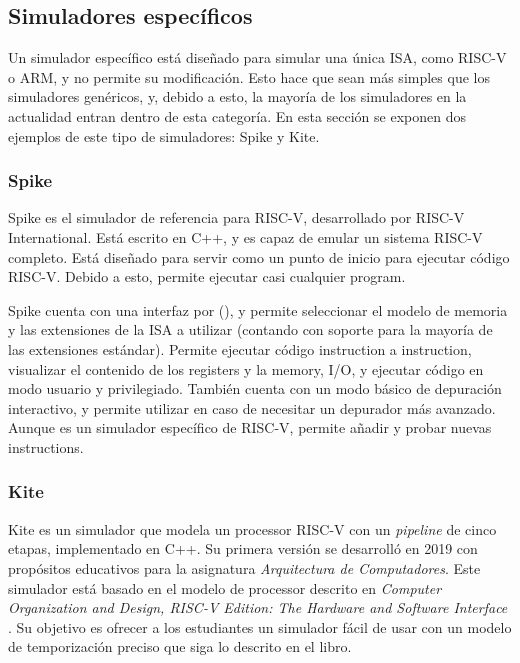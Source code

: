 \subsection{Simuladores específicos}

Un simulador específico está diseñado para simular una única \gls{ISA}, como
RISC-V o ARM, y no permite su modificación. Esto hace que sean más simples que
los simuladores genéricos, y, debido a esto, la mayoría de los simuladores en la
actualidad entran dentro de esta categoría. En esta sección se exponen dos
ejemplos de este tipo de simuladores: Spike y Kite.

\subsubsection{Spike}

Spike \parencite{spike} es el simulador de referencia para RISC-V, desarrollado
por RISC-V International. Está escrito en C++, y es capaz de emular un sistema
RISC-V completo. Está diseñado para servir como un punto de inicio para ejecutar
código RISC-V. Debido a esto, permite ejecutar casi cualquier \gls{program}.

Spike cuenta con una interfaz por 
(), y permite seleccionar el modelo de memoria y las
extensiones de la \gls{ISA} a utilizar (contando con soporte para la mayoría de
las extensiones estándar). Permite ejecutar código \gls{instruction} a
\gls{instruction}, visualizar el contenido de los \glspl{register} y la
\gls{memory}, I/O, y ejecutar código en modo usuario y privilegiado. También
cuenta con un modo básico de depuración interactivo, y permite utilizar
 en caso de necesitar un depurador más avanzado. Aunque es un
simulador específico de RISC-V, permite añadir y probar nuevas
\glspl{instruction}.


\subsubsection{Kite}

Kite \parencite{kite} \parencite{kite-gh} es un simulador que modela un
\gls{processor} RISC-V con un \textit{pipeline} de cinco etapas, implementado en
C++. Su primera versión se desarrolló en 2019 con propósitos educativos para la
asignatura \textit{Arquitectura de Computadores}. Este simulador está basado en
el modelo de \gls{processor} descrito en \textit{Computer Organization and
Design, RISC-V Edition: The Hardware and Software Interface}
\parencite{kite-book}. Su objetivo es ofrecer a los estudiantes un simulador
fácil de usar con un modelo de temporización preciso que siga lo descrito en el
libro.

